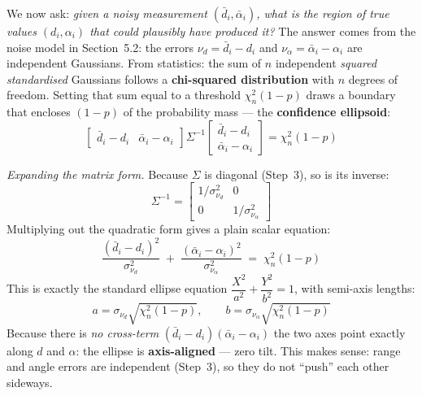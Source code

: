 \documentclass[12pt, a4paper]{article}
\begin{document}
We now ask: \emph{given a noisy measurement $(\bar{d}_i, \bar{\alpha}_i)$,
what is the region of true values $(d_i, \alpha_i)$ that could plausibly
have produced it?}
The answer comes from the noise model in Section~5.2: the errors
$\nu_d = \bar{d}_i - d_i$ and $\nu_\alpha = \bar{\alpha}_i - \alpha_i$
are independent Gaussians.
From statistics: the sum of $n$ independent \emph{squared standardised}
Gaussians follows a \textbf{chi-squared distribution} with $n$ degrees of
freedom.
Setting that sum equal to a threshold $\chi^2_n(1-p)$ draws a
boundary that encloses $(1-p)$ of the probability mass --- the
\textbf{confidence ellipsoid}:
\[
  \begin{bmatrix} \bar{d}_i - d_i & \bar{\alpha}_i - \alpha_i \end{bmatrix}
  \Sigma^{-1}
  \begin{bmatrix} \bar{d}_i - d_i \\ \bar{\alpha}_i - \alpha_i \end{bmatrix}
  = \chi^2_n(1-p)
\]

\textit{Expanding the matrix form.}
Because $\Sigma$ is diagonal (Step~3), so is its inverse:
\[
  \Sigma^{-1}
  = \begin{bmatrix}
      1/\sigma_{\nu_d}^2 & 0 \\
      0 & 1/\sigma_{\nu_\alpha}^2
    \end{bmatrix}
\]
Multiplying out the quadratic form gives a plain scalar equation:
\[
  \frac{(\bar{d}_i - d_i)^2}{\sigma_{\nu_d}^2}
  \;+\;
  \frac{(\bar{\alpha}_i - \alpha_i)^2}{\sigma_{\nu_\alpha}^2}
  \;=\; \chi^2_n(1-p)
\]
This is exactly the standard ellipse equation
$\dfrac{X^2}{a^2}+\dfrac{Y^2}{b^2}=1$, with semi-axis lengths:
\[
  a = \sigma_{\nu_d}\sqrt{\chi^2_n(1-p)}, \qquad
  b = \sigma_{\nu_\alpha}\sqrt{\chi^2_n(1-p)}
\]
Because there is \emph{no cross-term} $(\bar{d}_i-d_i)(\bar{\alpha}_i-\alpha_i)$
the two axes point exactly along $d$ and $\alpha$: the ellipse is
\textbf{axis-aligned} --- zero tilt.
This makes sense: range and angle errors are independent (Step~3),
so they do not ``push'' each other sideways.
\end{document}
